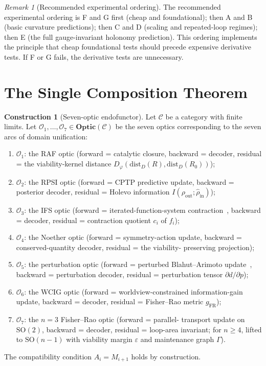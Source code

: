 \documentclass[11pt,a4paper]{article}
\theoremstyle{plain}
\theoremstyle{definition}
\newtheorem{construction}[theorem]{Construction}
\theoremstyle{remark}
\newtheorem{remark}[theorem]{Remark}
\newcommand{\OO}{\mathcal{O}}
\newcommand{\CC}{\mathcal{C}}
\newcommand{\SO}{\mathrm{SO}}
\newcommand{\Optic}{\mathbf{Optic}}
\begin{document}
\begin{remark}[Recommended experimental ordering]
\label{rem:ordering}
The recommended experimental ordering is F and G first (cheap and
foundational); then A and B (basic curvature predictions); then C and
D (scaling and repeated-loop regimes); then E (the full gauge-invariant
holonomy prediction). This ordering implements the principle that cheap
foundational tests should precede expensive derivative tests. If F or G
fails, the derivative tests are unnecessary.
\end{remark}


\section{The Single Composition Theorem}\label{sec:composition}

\begin{construction}[Seven-optic endofunctor]
\label{con:seven}
Let $\CC$ be a category with finite limits. Let $\OO_1,\ldots,\OO_7\in
\Optic(\CC)$ be the seven optics corresponding to the seven arcs of
domain unification:
\begin{enumerate}[leftmargin=*,itemsep=1pt]
\item $\OO_1$: the RAF optic (forward = catalytic closure, backward =
decoder, residual = the viability-kernel distance
$D_\varphi(\mathrm{dist}_D(R),\mathrm{dist}_D(R_0))$);
\item $\OO_2$: the RPSI optic (forward = CPTP predictive update,
backward = posterior decoder, residual = Holevo information
$I(\rho_{\mathrm{out}};\hat\rho_{\mathrm{in}})$);
\item $\OO_3$: the IFS optic (forward = iterated-function-system
contraction~\cite{hutchinson1981,barnsley1988}, backward = decoder,
residual = contraction quotient $c_i$ of $f_i$);
\item $\OO_4$: the Noether optic (forward = symmetry-action update,
backward = conserved-quantity decoder, residual = the viability-
preserving projection);
\item $\OO_5$: the perturbation optic (forward = perturbed
Blahut--Arimoto update~\cite{blahut1972,arimoto1972}, backward =
perturbation decoder, residual = perturbation tensor
$\partial d/\partial p$);
\item $\OO_6$: the WCIG optic (forward = worldview-constrained
information-gain update, backward = decoder, residual = Fisher--Rao
metric $g_{\mathrm{FR}}$);
\item $\OO_7$: the $n=3$ Fisher--Rao optic (forward = parallel-
transport update on $\SO(2)$, backward = decoder, residual = loop-area
invariant; for $n\geq 4$, lifted to $\SO(n-1)$ with viability margin
$\varepsilon$ and maintenance graph $\Gamma$).
\end{enumerate}
The compatibility condition $A_i = M_{i+1}$ holds by construction.
\end{construction}
\end{document}
